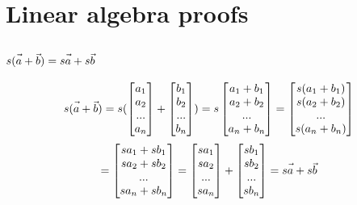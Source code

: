 \documentclass{article}
\newcommand{\fvec}[1]{\vec{\vphantom{A}#1}}
\begin{document}
\section{Linear algebra proofs}
\subsection{$ s(\fvec{a} + \fvec{b}) = s\fvec{a} + s\fvec{b} $}
$$ s(\fvec{a} + \fvec{b}) =
   s(\begin{bmatrix}a_1 \\ a_2 \\ ... \\ a_n\end{bmatrix} + \begin{bmatrix}b_1 \\ b_2 \\ ... \\ b_n\end{bmatrix}) =
   s\begin{bmatrix}a_1 + b_1 \\ a_2 + b_2 \\ ... \\ a_n + b_n\end{bmatrix} =
   \begin{bmatrix}s(a_1 + b_1) \\ s(a_2 + b_2) \\ ... \\ s(a_n + b_n)\end{bmatrix} $$
$$ = \begin{bmatrix}s a_1 + s b_1 \\ s a_2 + s b_2 \\ ... \\ s a_n + s b_n\end{bmatrix} =
   \begin{bmatrix}s a_1 \\ s a_2 \\ ... \\ s a_n\end{bmatrix} + \begin{bmatrix}s b_1 \\ s b_2 \\ ... \\ s b_n\end{bmatrix} =
   s\fvec{a} + s\fvec{b} $$
\end{document}
